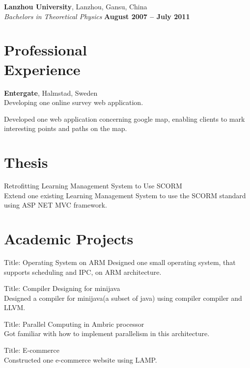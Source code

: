 \documentclass[margin,line]{resume}
\begin{document}
\begin{resume}
		\textbf{Lanzhou University}, Lanzhou, Gansu, China \vspace{2mm}\\\vspace{1mm}%
		\textsl{Bachelors in Theoretical Physics} \hfill \textbf{ August 2007 -- July 2011}\vspace{-3mm}\\\vspace{-1mm}%

	\section{\mysidestyle Professional\\Experience}
		\textbf{Entergate}, Halmstad, Sweden \vspace{2mm}\\\vspace{1mm}%
		Developing one online survey web application.

		Developed one web application concerning google map, enabling clients to mark interesting points and paths on the map.

	\section{\mysidestyle Thesis}
		Retrofitting Learning Management System to Use SCORM \\
		Extend one existing Learning Management System to use the SCORM standard using ASP NET MVC framework.

	\section{\mysidestyle Academic Projects}
		Title: Operating System on ARM
		Designed one small operating system, that supports scheduling and IPC, on ARM architecture.

		Title: Compiler Designing for minijava\\
		Designed a compiler for minijava(a subset of java) using compiler compiler and LLVM.

		Title: Parallel Computing in Ambric processor\\
		Got familiar with how to implement parallelism in this architecture.

		Title: E-commerce\\
		Constructed one e-commerce website using LAMP.



\end{resume}
\end{document}
